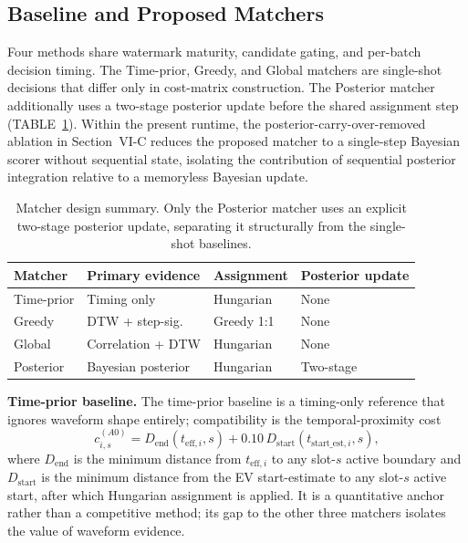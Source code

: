 \documentclass{ieeeaccess}
\begin{document}
    \subsection{Baseline and Proposed Matchers}
    Four methods share watermark maturity, candidate gating, and per-batch decision timing.
    The Time-prior, Greedy, and Global matchers are single-shot decisions that differ only in cost-matrix construction.
    The Posterior matcher additionally uses a two-stage posterior update before the shared assignment step (TABLE~\ref{table2}).
    Within the present runtime, the posterior-carry-over-removed ablation in Section~VI-C reduces the proposed matcher to a single-step Bayesian scorer without sequential state, isolating the contribution of sequential posterior integration relative to a memoryless Bayesian update.

    \begin{table}[htbp]
        \caption{Matcher design summary. Only the Posterior matcher uses an explicit two-stage posterior update, separating it structurally from the single-shot baselines.}
        \label{table2}
        \centering
        \setlength{\tabcolsep}{3pt}
        \scriptsize
        \begin{tabular}{@{}l p{2.1cm} p{1.5cm} p{1.3cm}@{}}
            \toprule
            \textbf{Matcher} & \textbf{Primary evidence} & \textbf{Assignment} & \textbf{Posterior update} \\
            \midrule
            Time-prior & Timing only & Hungarian & None \\
            Greedy & DTW + step-sig. & Greedy 1:1 & None \\
            Global & Correlation + DTW & Hungarian & None \\
            Posterior & Bayesian posterior & Hungarian & Two-stage \\
            \bottomrule
        \end{tabular}
    \end{table}

    \textbf{Time-prior baseline.}
    The time-prior baseline is a timing-only reference that ignores waveform shape entirely; compatibility is the temporal-proximity cost
    \begin{equation}\label{eq:a0}
        c^{(A0)}_{i,s} = D_{\text{end}}(t_{\text{eff},i}, s) + 0.10\,D_{\text{start}}(t_{\text{start\_est},i}, s),
    \end{equation}
    where $D_{\text{end}}$ is the minimum distance from $t_{\text{eff},i}$ to any slot-$s$ active boundary and $D_{\text{start}}$ is the minimum distance from the EV start-estimate to any slot-$s$ active start, after which Hungarian assignment is applied.
    It is a quantitative anchor rather than a competitive method; its gap to the other three matchers isolates the value of waveform evidence.
\end{document}
